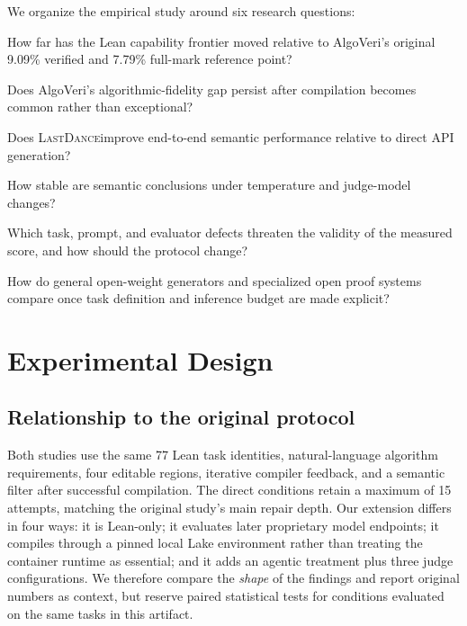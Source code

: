 \documentclass{article}
\newcommand{\lastdance}{\textsc{LastDance}}
\begin{document}
We organize the empirical study around six research questions:

\begin{description}[leftmargin=3.2em,style=nextline]
  \item[RQ1] How far has the Lean capability frontier moved relative to AlgoVeri's
             original 9.09\% verified and 7.79\% full-mark reference point?
  \item[RQ2] Does AlgoVeri's algorithmic-fidelity gap persist after compilation becomes
             common rather than exceptional?
  \item[RQ3] Does \lastdance improve end-to-end semantic
             performance relative to direct API generation?
  \item[RQ4] How stable are semantic conclusions under temperature and judge-model
             changes?
  \item[RQ5] Which task, prompt, and evaluator defects threaten the validity of the
             measured score, and how should the protocol change?
  \item[RQ6] How do general open-weight generators and specialized open proof systems
             compare once task definition and inference budget are made explicit?
\end{description}

\section{Experimental Design}

\subsection{Relationship to the original protocol}

Both studies use the same 77 Lean task identities, natural-language algorithm
requirements, four editable regions, iterative compiler feedback, and a semantic filter
after successful compilation.  The direct conditions retain a maximum of 15 attempts,
matching the original study's main repair depth.  Our extension differs in four ways:
it is Lean-only; it evaluates later proprietary model endpoints; it compiles through a
pinned local Lake environment rather than treating the container runtime as essential;
and it adds an agentic treatment plus three judge configurations.  We therefore compare
the \emph{shape} of the findings and report original numbers as context, but reserve
paired statistical tests for conditions evaluated on the same tasks in this artifact.
\end{document}
